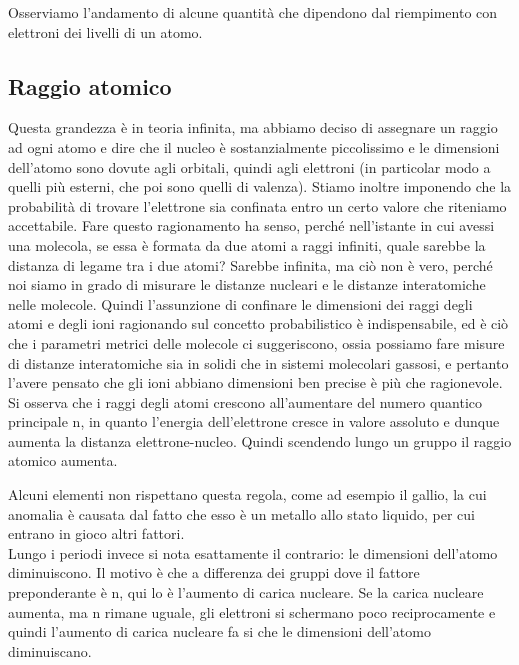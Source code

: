 Osserviamo l'andamento di alcune quantità che dipendono dal riempimento con elettroni dei livelli di un atomo.

\subsection{Raggio atomico}

Questa grandezza è in teoria infinita, ma abbiamo deciso di assegnare un raggio ad ogni atomo e dire che il nucleo è sostanzialmente piccolissimo e le dimensioni dell'atomo sono dovute agli orbitali, quindi agli elettroni (in particolar modo a quelli più esterni, che poi sono quelli di valenza). Stiamo inoltre imponendo che la probabilità di trovare l'elettrone sia confinata entro un certo valore che riteniamo accettabile. Fare questo ragionamento ha senso, perché nell'istante in cui avessi una molecola, se essa è formata da due atomi a raggi infiniti, quale sarebbe la distanza di legame tra i due atomi? Sarebbe infinita, ma ciò non è vero, perché noi siamo in grado di misurare le distanze nucleari e le distanze interatomiche nelle molecole. Quindi l'assunzione di confinare le dimensioni dei raggi degli atomi e degli ioni ragionando sul concetto probabilistico è indispensabile, ed è ciò che i parametri metrici delle molecole ci suggeriscono, ossia possiamo fare misure di distanze interatomiche sia in solidi che in sistemi molecolari gassosi, e pertanto l'avere pensato che gli ioni abbiano dimensioni ben precise è più che ragionevole.\\

Si osserva che i raggi degli atomi crescono all'aumentare del numero quantico principale n, in quanto l'energia dell'elettrone cresce in valore assoluto e dunque aumenta la distanza elettrone-nucleo. Quindi scendendo lungo un gruppo il raggio atomico aumenta.


Alcuni elementi non rispettano questa regola, come ad esempio il gallio, la cui anomalia è causata dal fatto che esso è un metallo allo stato liquido, per cui entrano in gioco altri fattori.\\

Lungo i periodi invece si nota esattamente il contrario: le dimensioni dell'atomo diminuiscono. Il motivo è che a differenza dei gruppi dove il fattore preponderante è n, qui lo è l'aumento di carica nucleare. Se la carica nucleare aumenta, ma n rimane uguale, gli elettroni si schermano poco reciprocamente e quindi l'aumento di carica nucleare fa si che le dimensioni dell'atomo diminuiscano.

